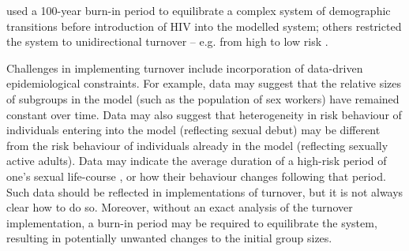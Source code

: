 \citet{Boily2015} used a 100-year burn-in period
to equilibrate a complex system of demographic transitions before 
introduction of HIV into the modelled system;
others restricted the system to unidirectional turnover -- e.g. from high to low risk
\citep{Eaton2014}.
\par
Challenges in implementing turnover include
incorporation of data-driven epidemiological constraints.
For example, data may suggest
that the relative sizes of subgroups in the model
(such as the population of sex workers)
have remained constant over time. %
Data may also suggest that heterogeneity in risk behaviour
of individuals entering into the model (reflecting sexual debut)
may be different from the risk behaviour
of individuals already in the model (reflecting sexually active adults). %
Data may indicate the average duration
of a high-risk period of one's sexual life-course \citep{Watts2010}, %
or how their behaviour changes following that period. %
Such data should be reflected in implementations of turnover,
but it is not always clear how to do so.
Moreover, without an exact analysis of the turnover implementation,
a burn-in period may be required to equilibrate the system,
resulting in potentially unwanted changes to the initial group sizes.
